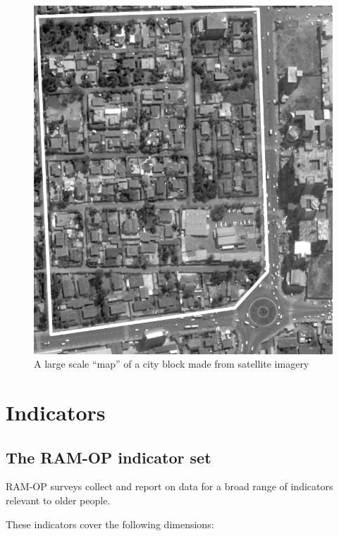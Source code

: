 \documentclass[12pt,a4paper]{book}
\theoremstyle{definition}
\theoremstyle{definition}
\theoremstyle{definition}
\theoremstyle{remark}
\begin{document}
\begin{figure}[H]

{\centering \includegraphics[width=9.76in]{figures/stage2sample15} 

}

\caption{A large scale “map” of a city block made from satellite imagery}\label{fig:sample29}
\end{figure}

\hypertarget{indicators}{%
\chapter{Indicators}\label{indicators}}

\hypertarget{the-ram-op-indicator-set}{%
\section{The RAM-OP indicator set}\label{the-ram-op-indicator-set}}

RAM-OP surveys collect and report on data for a broad range of
indicators relevant to older people.

These indicators cover the following dimensions:
\end{document}
